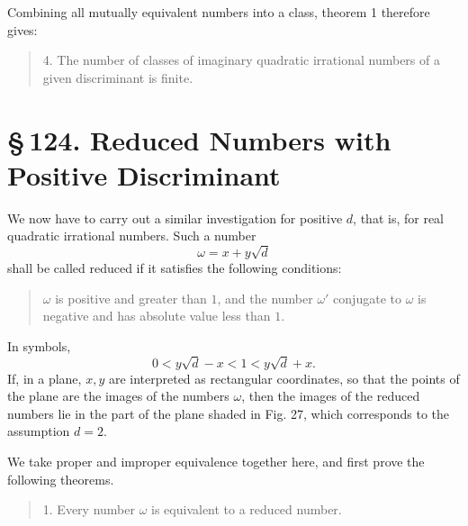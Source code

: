 \documentclass[11pt]{article}
\providecommand{\sect}[2]{\section*{\S\,#1. #2}}
\begin{document}
Combining all mutually equivalent numbers into a class, theorem 1 therefore gives:
\begin{quote}
4. The number of classes of imaginary quadratic irrational numbers of a given discriminant is finite.
\end{quote}





\sect{124}{Reduced Numbers with Positive Discriminant}

We now have to carry out a similar investigation for positive $d$, that is, for real quadratic irrational numbers. Such a number
\[
        \omega=x+y\sqrt d
\]
shall be called reduced if it satisfies the following conditions:
\begin{quote}
$\omega$ is positive and greater than $1$, and the number $\omega'$ conjugate to $\omega$ is negative and has absolute value less than $1$.
\end{quote}
In symbols,
\[
\tag{1}        0<y\sqrt d-x<1<y\sqrt d+x.
\]
If, in a plane, $x,y$ are interpreted as rectangular coordinates, so that the points of the plane are the images of the numbers $\omega$, then the images of the reduced numbers lie in the part of the plane shaded in Fig. 27, which corresponds to the assumption $d=2$.

\begin{figure}[h]
\centering
{}
\par{}
\end{figure}

We take proper and improper equivalence together here, and first prove the following theorems.

\begin{quote}
1. Every number $\omega$ is equivalent to a reduced number.
\end{quote}
\end{document}
